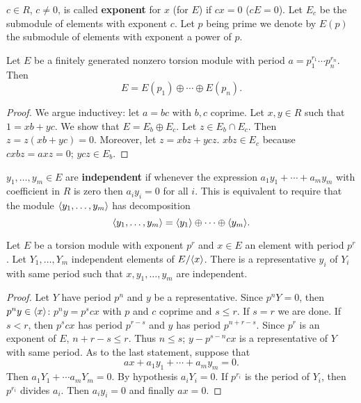 $c\in R$, $c \neq 0$, is called \textbf{exponent} for $x$ (for $E$) if $cx=0$ ($cE=0$). 
Let $E_c$ be the submodule of elements with exponent $c$. 
Let $p$ being prime we denote by $E(p)$ the submodule of elements with exponent a power of $p$. 

\begin{thm}
Let $E$ be a finitely generated nonzero torsion module with period $a=p_1 ^{r_1} \cdots p_n ^{r_n}$. 
Then 
$$E=E(p_1) \oplus \cdots \oplus E(p_n)\text{.}$$
\begin{proof}
We argue inductivey: let $a=bc$ with $b,c$ coprime. 
Let $x , y \in R$ such that $1=xb+yc$. 
We show that $E=E_b \oplus E_c$. 
Let $z \in E_b \cap E_c$. 
Then $z=z(xb+yc)=0$. 
Moreover, let $z =xbz + ycz$. 
$xbz \in E_c$ because $cxbz=axz=0$; $ycz \in E_b$. 
\end{proof}
\end{thm}

$y_1, \ldots, y_m \in E$ are \textbf{independent} if whenever the expression $a_1 y_1 + \cdots + a_m y_m$ with coefficient in $R$ is zero then $a_i y_i =0$ for all $i$. 
This is equivalent to require that the module $\langle y_1 , \ldots , y_m\rangle$ has decomposition 
$$\langle y_1 , \ldots , y_m\rangle = \langle y_1\rangle \oplus \cdots \oplus \langle y_m\rangle  \text{.}$$ 

\begin{lem} Let $E$ be a torsion module with exponent $p^r$ and $ x \in E$ an element with period $p^r$. 
Let $Y_1, \ldots, Y_m$ independent elements of $E/\langle x\rangle$. 
There is a representative $y_i$ of $Y_i$ with same period such that $x, y_1, \ldots, y_m$ are independent.

\begin{proof}
Let $Y$ have period $p^n$ and $y$ be a representative. 
Since $p^n Y=0$, then $p^n y \in \langle x\rangle$: $p^n y =p^s c x$ with $p$ and $c$ coprime and $s \le r$. 
If $s=r$ we are done. 
If $s <r$, then $p^s cx$ has period $p^{r-s}$ and $y$ has period $p^{n+r-s}$. 
Since $p^r$ is an exponent of $E$, $n+r-s \le r$. 
Thus $n \le s$; $y-p^{s-n} c x$ is a representative of $Y$ with same period. 
As to the last statement, suppose that 
$$ax + a_1 y_1 + \cdots + a_m y_m=0\text{.}$$ 
Then $a_1 Y_1 + \cdots a_m Y_m=0$. 
By hypothesis $a_i Y_i=0$. 
If $p^{r_i}$ is the period of $Y_i$, then $p^{r_i}$ divides $a_i$. 
Then $a_i y_i =0$ and finally $ax=0$. 
\end{proof}
\end{lem}

